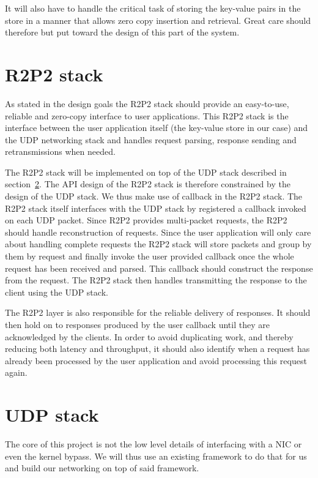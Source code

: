 It will also have to handle the critical task of storing the key-value
pairs in the store in a manner that allows zero copy insertion and
retrieval. Great care should therefore but put toward the design of
this part of the system.

\section{R2P2 stack}

As stated in the design goals the R2P2 stack should provide an
easy-to-use, reliable and zero-copy interface to user
applications. This R2P2 stack is the interface between the user
application itself (the key-value store in our case) and the UDP
networking stack and handles request parsing, response sending and
retransmissions when needed.

The R2P2 stack will be implemented on top of the UDP stack described in
section~\ref{sec:udp-design}. The API design of the R2P2 stack is
therefore constrained by the design of the UDP stack. We thus make use
of callback in the R2P2 stack. The R2P2 stack itself interfaces with
the UDP stack by registered a callback invoked on each UDP
packet. Since R2P2 provides multi-packet requests, the R2P2 should
handle reconstruction of requests. Since the user application will
only care about handling complete requests the R2P2 stack will store
packets and group by them by request and finally invoke the user
provided callback once the whole request has been received and
parsed. This callback should construct the response from the
request. The R2P2 stack then handles transmitting the response to the
client using the UDP stack.

The R2P2 layer is also responsible for the reliable delivery of
responses. It should then hold on to responses produced by the user
callback until they are acknowledged by the clients. In order to avoid
duplicating work, and thereby reducing both latency and throughput,
it should also identify when a request has already been processed by
the user application and avoid processing this request again.

\section{UDP stack} \label{sec:udp-design}

The core of this project is not the low level details of interfacing
with a NIC or even the kernel bypass. We will thus use an existing
framework to do that for us and build our networking on top of said
framework.

